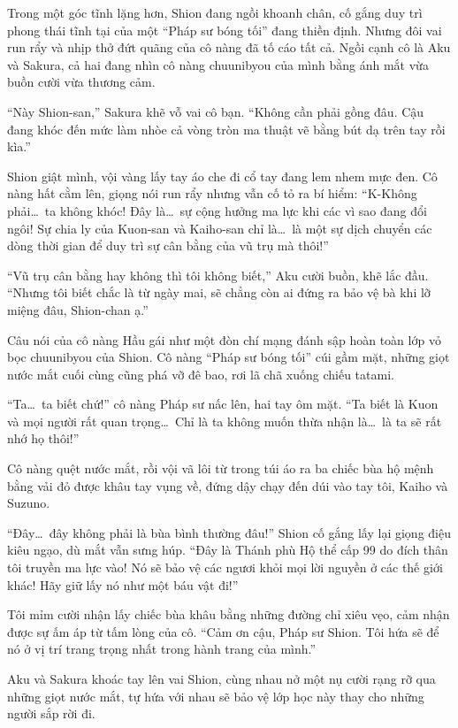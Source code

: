 \documentclass[../main.tex]{subfiles}
\begin{document}
\ct

Trong một góc tĩnh lặng hơn, Shion đang ngồi khoanh chân, cố gắng duy trì phong thái tĩnh tại của một ``Pháp sư bóng tối'' đang thiền định. Nhưng đôi vai run rẩy và nhịp thở đứt quãng của cô nàng đã tố cáo tất cả. Ngồi cạnh cô là Aku và Sakura, cả hai đang nhìn cô nàng chuunibyou của mình bằng ánh mắt vừa buồn cười vừa thương cảm.

``Này Shion-san,'' Sakura khẽ vỗ vai cô bạn. ``Không cần phải gồng đâu. Cậu đang khóc đến mức làm nhòe cả vòng tròn ma thuật vẽ bằng bút dạ trên tay rồi kìa.''

Shion giật mình, vội vàng lấy tay áo che đi cổ tay đang lem nhem mực đen. Cô nàng hất cằm lên, giọng nói run rẩy nhưng vẫn cố tỏ ra bí hiểm: ``K-Không phải\dots\ ta không khóc! Đây là\dots\ sự cộng hưởng ma lực khi các vì sao đang đổi ngôi! Sự chia ly của Kuon-san và Kaiho-san chỉ là\dots\ là một sự dịch chuyển các dòng thời gian để duy trì sự cân bằng của vũ trụ mà thôi!''

``Vũ trụ cân bằng hay không thì tôi không biết,'' Aku cười buồn, khẽ lắc đầu. ``Nhưng tôi biết chắc là từ ngày mai, sẽ chẳng còn ai đứng ra bảo vệ bà khi lỡ miệng đâu, Shion-chan ạ.''

Câu nói của cô nàng Hầu gái như một đòn chí mạng đánh sập hoàn toàn lớp vỏ bọc chuunibyou của Shion. Cô nàng ``Pháp sư bóng tối'' cúi gầm mặt, những giọt nước mắt cuối cùng cũng phá vỡ đê bao, rơi lã chã xuống chiếu tatami.

``Ta\dots\ ta biết chứ!'' cô nàng Pháp sư nấc lên, hai tay ôm mặt. ``Ta biết là Kuon và mọi người rất quan trọng\dots\ Chỉ là ta không muốn thừa nhận là\dots\ là ta sẽ rất nhớ họ thôi!''

Cô nàng quệt nước mắt, rồi vội vã lôi từ trong túi áo ra ba chiếc bùa hộ mệnh bằng vải đỏ được khâu tay vụng về, đứng dậy chạy đến dúi vào tay tôi, Kaiho và Suzuno.

``Đây\dots\ đây không phải là bùa bình thường đâu!'' Shion cố gắng lấy lại giọng điệu kiêu ngạo, dù mắt vẫn sưng húp. ``Đây là Thánh phù Hộ thể cấp 99 do đích thân tôi truyền ma lực vào! Nó sẽ bảo vệ các ngươi khỏi mọi lời nguyền ở các thế giới khác! Hãy giữ lấy nó như một báu vật đi!''

Tôi mỉm cười nhận lấy chiếc bùa khâu bằng những đường chỉ xiêu vẹo, cảm nhận được sự ấm áp từ tấm lòng của cô. ``Cảm ơn cậu, Pháp sư Shion. Tôi hứa sẽ để nó ở vị trí trang trọng nhất trong hành trang của mình.''

Aku và Sakura khoác tay lên vai Shion, cùng nhau nở một nụ cười rạng rỡ qua những giọt nước mắt, tự hứa với nhau sẽ bảo vệ lớp học này thay cho những người sắp rời đi.
\end{document}
